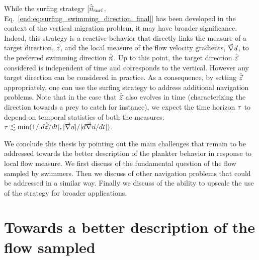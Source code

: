While the surfing strategy [$\hat{\vec{n}}_{\mathrm{surf}}$, Eq.~\eqref{end:eq:surfing_swimming_direction_final}] has been developed in the context of the vertical migration problem, it may have broader significance.
Indeed, this strategy is a reactive behavior that directly links the measure of a target direction, $\hat{\vec{z}}$, and the local measure of the flow velocity gradients, $\vec{\nabla} \vec{u}$, to the preferred swimming direction $\hat{\vec{n}}$.
Up to this point, the target direction $\hat{\vec{z}}$ considered is independent of time and corresponds to the vertical.
However any target direction can be considered in practice.
As a consequence, by setting $\hat{\vec{z}}$ appropriately, one can use the surfing strategy to address additional navigation problems.
Note that in the case that $\hat{\vec{z}}$ also evolves in time (characterizing the direction towards a prey to catch for instance), we expect the time horizon $\tau$ to depend on temporal statistics of both the measures: $\tau \lesssim \min(1/\lvert d\hat{\vec{z}}/dt\rvert, \lvert\vec{\nabla} \vec{u}\rvert/\lvert d\vec{\nabla} \vec{u}/dt\rvert)$.

We conclude this thesis by pointing out the main challenges that remain to be addressed towards the better description of the plankter behavior in response to local flow measure.
We first discuss of the fundamental question of the flow sampled by swimmers.
Then we discuss of other navigation problems that could be addressed in a similar way.
Finally we discuss of the ability to upscale the use of the strategy for broader applications.

\section{Towards a better description of the flow sampled}

